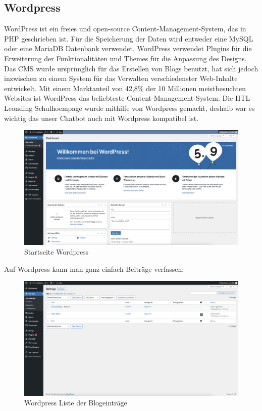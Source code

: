 \subsection{Wordpress}
WordPress ist ein freies und open-source Content-Management-System, das in PHP geschrieben ist.
Für die Speicherung der Daten wird entweder eine MySQL oder eine MariaDB Datenbank verwendet.
WordPress verwendet Plugins für die Erweiterung der Funktionalitäten und Themes für die Anpassung des Designs.
Das CMS wurde ursprünglich für das Erstellen von Blogs benutzt, hat sich jedoch inzwischen zu einem System für das Verwalten verschiedenster Web-Inhalte entwickelt.
Mit einem Marktanteil von 42,8\% der 10 Millionen meistbesuchten Websites ist WordPress das beliebteste Content-Management-System.
Die HTL Leonding Schulhoempage wurde mithilfe von Wordpress gemacht, deshalb war es wichtig das unser Chatbot auch mit Wordpress kompatibel ist.


\begin{figure}[hbt!]
    \centering
    \includegraphics[scale=0.2]{pics/wordpresshome}
    \caption{Startseite Wordpress}
    \label{fig:impl:wordpresshome}
\end{figure}


Auf Wordpress kann man ganz einfach Beiträge verfassen:

\begin{figure}[hbt!]
    \centering
    \includegraphics[scale=0.2]{pics/bloglist}
    \caption{Wordpress Liste der Blogeinträge}
    \label{fig:impl:bloglist}
\end{figure}


